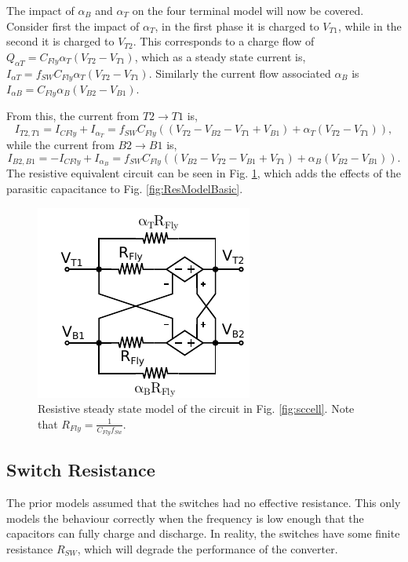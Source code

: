 	The impact of $\alpha_B$ and $\alpha_T$ on the four terminal model will now be covered. Consider first the impact of $\alpha_T$, in the first phase it is charged to $V_{T1}$, while in the second it is charged to $V_{T2}$. This corresponds to a charge flow of $Q_{\alpha T} = C_{Fly}\alpha_T(V_{T2} - V_{T1})$, which as a steady state current is, $I_{\alpha T} = f_{SW}C_{Fly}\alpha_T(V_{T2} - V_{T1})$. Similarly the current flow associated $\alpha_B$ is $I_{\alpha B} = C_{Fly}\alpha_B(V_{B2} - V_{B1})$.
	
	From this, the current from ${T2} \rightarrow {T1}$ is, 
	\begin{equation}
		I_{T2,T1} = I_{CFly} + I_{\alpha_T} = f_{SW}C_{Fly}\left((V_{T2} - V_{B2} - V_{T1} + V_{B1}) + \alpha_T(V_{T2} - V_{T1})\right),
	\end{equation}
	while the current from ${B2} \rightarrow {B1}$ is,
	\begin{equation}
		I_{B2,B1} = -I_{CFly} + I_{\alpha_B} = f_{SW}C_{Fly}\left((V_{B2} - V_{T2} - V_{B1} + V_{T1}) + \alpha_B(V_{B2} - V_{B1})\right).
	\end{equation}
	The resistive equivalent circuit can be seen in Fig. \ref{fig:resModel}, which adds the effects of the parasitic capacitance to Fig. \ref{fig:ResModelBasic}.
	\begin{figure}
		\centering
		\includegraphics[width=0.4\linewidth]{4Terminal/Figures/CellRes.pdf}
		\caption{Resistive steady state model of the circuit in Fig. \ref{fig:sccell}. Note that $R_{Fly} = \frac{1}{C_{Fly}f_{Sw}}$.}
		\label{fig:resModel}
	\end{figure}
	
	\subsection{Switch Resistance}
	The prior models assumed that the switches had no effective resistance. This only models the behaviour correctly when the frequency is low enough that the capacitors can fully charge and discharge. In reality, the switches have some finite resistance $R_{SW}$, which will degrade the performance of the converter.
	
